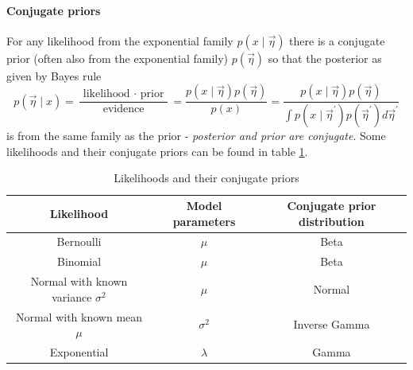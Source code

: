 

\paragraph*{Conjugate priors} For any likelihood from the exponential family $p(x \mid \vec{\eta})$ there is a conjugate prior
(often also from the exponential family) $p(\vec{\eta})$ so that the posterior as given by Bayes rule
\begin{equation}
    p(\vec{\eta} \mid x)=\frac{\text { likelihood } \cdot \text { prior }}{\text { evidence }}=\frac{p(x \mid \vec{\eta}) p(\vec{\eta})}{p(x)}=\frac{p(x \mid \vec{\eta}) p(\vec{\eta})}{\int p\left(x \mid \vec{\eta}^{\prime}\right) p\left(\vec{\eta}^{\prime}\right) d \vec{\eta}^{\prime}}
\end{equation}
is from the same family as the prior - \textit{posterior and prior are conjugate}. Some likelihoods and their conjugate priors can be found in table \ref{tab:conjugate_priors}.

\begin{table}[!htb]
    \centering
    \begin{tabular}{|c|c|c|}
    \hline
    \textbf{Likelihood} & \textbf{Model parameters} & \textbf{Conjugate prior distribution} \\ \hline
    Bernoulli & $\mu$ & Beta \\ \hline
    Binomial & $\mu$ & Beta \\ \hline
    Normal with known variance $\sigma^2$ & $\mu$ & Normal \\ \hline
    Normal with known mean $\mu$ & $\sigma^2$ & Inverse Gamma \\ \hline
    Exponential & $\lambda$ & Gamma \\ \hline
    \end{tabular}
    \caption{Likelihoods and their conjugate priors}
    \label{tab:conjugate_priors}
\end{table}

